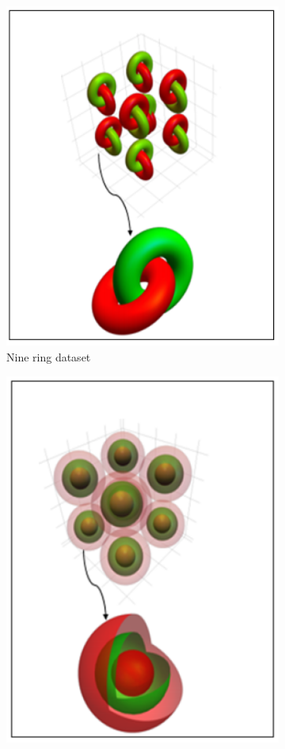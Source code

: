 \documentclass{bmvc2k}
\begin{document}
\begin{figure}
\centering
\begin{subfigure}[t]{.4\textwidth}
  \centering
  \includegraphics[width=.9\linewidth]{images/nine_ring.png}
  \caption{Nine ring dataset}
  \label{nine_ring_dataset}
\end{subfigure}\hfill
\begin{subfigure}[t]{.45\textwidth}
  \centering
  \includegraphics[width=.74\linewidth]{images/nine_sphere.png}

\end{subfigure}
\end{figure}
\end{document}
